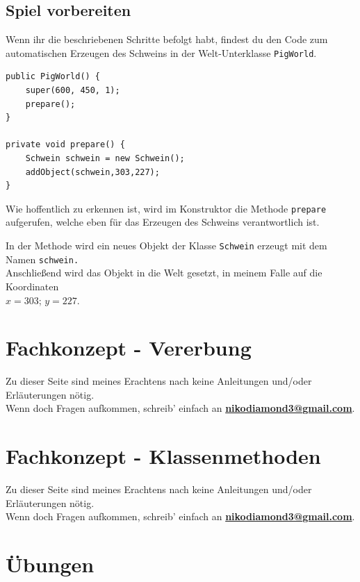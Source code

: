 \documentclass{scrartcl}   %
\begin{document}
\newpage

\subsection{Spiel vorbereiten}

Wenn ihr die beschriebenen Schritte befolgt habt, findest du den Code zum automatischen Erzeugen des Schweins in der Welt-Unterklasse \texttt{PigWorld}.\\
\begin{lstlisting}
public PigWorld() {    
    super(600, 450, 1); 
    prepare();
}

private void prepare() {
    Schwein schwein = new Schwein();
    addObject(schwein,303,227);
}
\end{lstlisting}

Wie hoffentlich zu erkennen ist, wird im Konstruktor die Methode \texttt{prepare} aufgerufen, welche eben für das Erzeugen des Schweins verantwortlich ist.

In der Methode wird ein neues Objekt der Klasse \texttt{Schwein} erzeugt mit dem Namen \texttt{schwein.}\\
Anschließend wird das Objekt in die Welt gesetzt, in meinem Falle auf die Koordinaten\\
$x=303$; $y=227$.

\newpage

\section{Fachkonzept - Vererbung}

Zu dieser Seite sind meines Erachtens nach keine Anleitungen und/oder Erläuterungen nötig.\\
Wenn doch Fragen aufkommen, schreib' einfach an \textbf{\href{mailto:nikodiamond3@gmail.com}{nikodiamond3@gmail.com}}.

\newpage

\section{Fachkonzept - Klassenmethoden}

Zu dieser Seite sind meines Erachtens nach keine Anleitungen und/oder Erläuterungen nötig.\\
Wenn doch Fragen aufkommen, schreib' einfach an \textbf{\href{mailto:nikodiamond3@gmail.com}{nikodiamond3@gmail.com}}.

\newpage

\section{Übungen}
\end{document}
